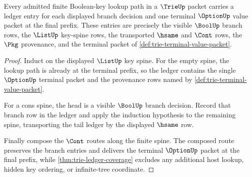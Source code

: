 \begin{theorem}\label{thm:trie-boolean-key-path-ledger-coverage}
Every admitted finite Boolean-key lookup path in a $\TrieUp$ packet carries a
ledger entry for each displayed branch decision and one terminal
$\OptionUp$ value packet at the final prefix. These entries are precisely the
visible $\BoolUp$ branch rows, the $\ListUp$ key-spine rows, the transported
$\hsame$ and $\Cont$ rows, the $\Pkg$ provenance, and the terminal packet of
\autoref{def:trie-terminal-value-packet}.
\end{theorem}
\begin{proof}
Induct on the displayed $\ListUp$ key spine. For the empty spine, the lookup
path is already at the terminal prefix, so the ledger contains the single
$\OptionUp$ terminal packet and the provenance rows named by
\autoref{def:trie-terminal-value-packet}.

For a cons spine, the head is a visible $\BoolUp$ branch decision. Record that
branch row in the ledger and apply the induction hypothesis to the remaining
spine, transporting the tail ledger by the displayed $\hsame$ row.

Finally compose the $\Cont$ routes along the finite spine. The composed route
preserves the branch entries and delivers the terminal $\OptionUp$ packet at
the final prefix, while \autoref{thm:trie-ledger-coverage} excludes any
additional host lookup, hidden key ordering, or infinite-tree coordinate.
\end{proof}

